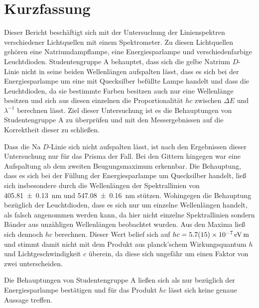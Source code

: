 \section{Kurzfassung}

	Dieser Bericht beschäftigt sich mit der Untersuchung der Linienspektren verschiedener Lichtquellen mit einem Spektrometer.
	Zu diesen Lichtquellen gehören eine Natriumdampflampe, eine Energiesparlampe und verschiedenfarbige Leuchtdioden.
	Studentengruppe A behauptet, dass sich die gelbe Natrium $D$-Linie nicht in seine beiden Wellenlängen aufspalten lässt, dass es sich bei der Energiesparlampe um eine mit Quecksilber befüllte Lampe handelt und dass die Leuchtdioden, da sie bestimmte Farben besitzen auch nur eine Wellenlänge besitzen und sich aus diesen einzelnen die Proportionalität $hc$ zwischen $\Delta E$ und $\lambda^{-1}$ berechnen lässt.
	Ziel dieser Untersuchung ist es die Behauptungen von Studentengruppe A zu überprüfen und mit den Messergebnissen auf die Korrektheit dieser zu schließen.
	
	Dass die Na $D$-Linie sich nicht aufspalten lässt, ist nach den Ergebnissen dieser Untersuchung nur für das Prisma der Fall.
	Bei den Gittern hingegen war eine Aufspaltung ab dem zweiten Beugungsmaximum erkennbar.
	Die Behauptung, dass es sich bei der Füllung der Energiesparlampe um Quecksilber handelt, ließ sich insbesondere durch die Wellenlängen der Spektrallinien von \SI{405.81+-0.13}{\nano\meter} und \SI{547.08+-0.16}{\nano\meter} stützen.
	Wohingegen die Behauptung bezüglich der Leuchtdioden, dass es sich nur um einzelne Wellenlängen handelt, als falsch angenommen werden kann, da hier nicht einzelne Spektrallinien sondern Bänder aus unzähligen Wellenlängen beobachtet wurden. 
	Aus den Maxima ließ sich dennoch $hc$ berechnen.
	Dieser Wert belief sich auf $hc = \SI{5,7+-1,5e-7}{\electronvolt\meter}$ und stimmt damit nicht mit dem Produkt aus planck'schem Wirkungsquantum $h$ und Lichtgeschwindigkeit $c$ überein, da diese sich ungefähr um einen Faktor von zwei unterscheiden.
	
	Die Behauptungen von Studentengruppe A ließen sich als nur bezüglich der Energiesparlampe bestätigen und für das Produkt $hc$ lässt sich keine genaue Aussage treffen.
	
	
